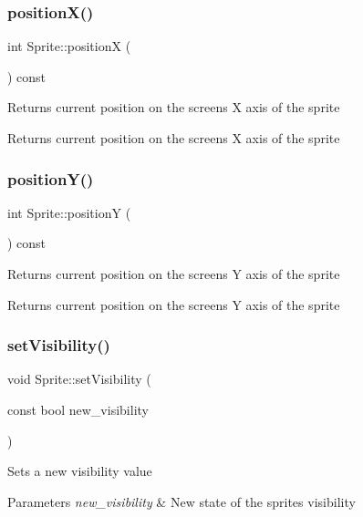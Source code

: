 \subsubsection{\texorpdfstring{position\+X()}{positionX()}}
{\footnotesize\ttfamily int Sprite\+::positionX (\begin{DoxyParamCaption}{ }\end{DoxyParamCaption}) const}

Returns current position on the screen\textquotesingle{}s X axis of the sprite

\begin{DoxyReturn}{Returns}
current position on the screen\textquotesingle{}s X axis of the sprite 
\end{DoxyReturn}
\mbox{\label{classSprite_a58b317b273657123c3050114d5e50d1b}} 
\subsubsection{\texorpdfstring{position\+Y()}{positionY()}}
{\footnotesize\ttfamily int Sprite\+::positionY (\begin{DoxyParamCaption}{ }\end{DoxyParamCaption}) const}

Returns current position on the screen\textquotesingle{}s Y axis of the sprite

\begin{DoxyReturn}{Returns}
current position on the screen\textquotesingle{}s Y axis of the sprite 
\end{DoxyReturn}
\mbox{\label{classSprite_ac0df5147803b139aa433b33eb2a42246}} 
\subsubsection{\texorpdfstring{set\+Visibility()}{setVisibility()}}
{\footnotesize\ttfamily void Sprite\+::set\+Visibility (\begin{DoxyParamCaption}\item[{const bool}]{new\+\_\+visibility }\end{DoxyParamCaption})}

Sets a new visibility value


\begin{DoxyParams}{Parameters}
{\em new\+\_\+visibility} & New state of the sprite\textquotesingle{}s visibility \\
\hline
\end{DoxyParams}


